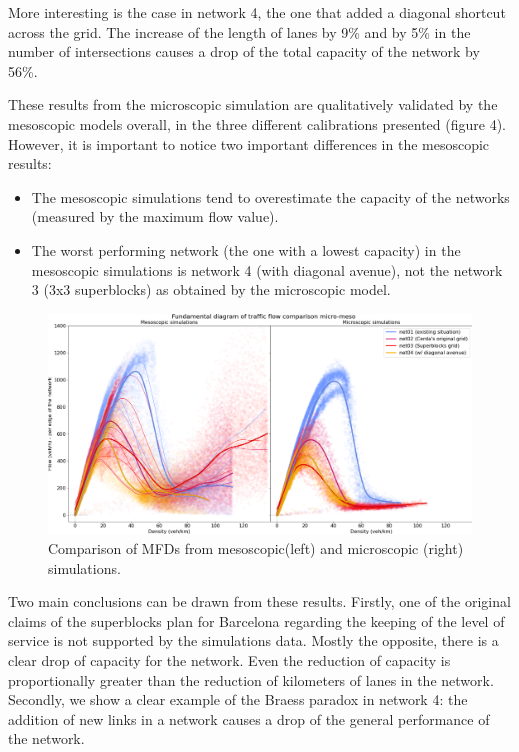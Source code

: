 \documentclass[11pt]{article}
\begin{document}
More interesting is the case in network 4, the one that added a diagonal shortcut across the grid. The increase of the length of lanes by 9\% and by 5\% in the number of intersections causes a drop of the total capacity of the network by 56\%.

These results from the microscopic simulation are qualitatively validated by the mesoscopic models overall, in the three different calibrations presented (figure 4). However, it is important to notice two important differences in the mesoscopic results:
\begin{itemize}
    \item The mesoscopic simulations tend to overestimate the capacity of the networks (measured by the maximum flow value).
    \item The worst performing network (the one with a lowest capacity) in the mesoscopic simulations is network 4 (with diagonal avenue), not the network 3 (3x3 superblocks) as obtained by the microscopic model.
\end{itemize}

\begin{figure}[htbp]
\centering
\includegraphics[width=\textwidth]{code/simulations/charts/MFD01_compar_micro-meso.png}
\caption{Comparison of MFDs from mesoscopic\footnotemark (left) and microscopic (right) simulations.}
\label{fig:MFD-comp-micro-meso.}
\end{figure}

Two main conclusions can be drawn from these results. Firstly, one of the original claims of the superblocks plan for Barcelona regarding the keeping of the level of service \citep{Rueda2018} is not supported by the simulations data. Mostly the opposite, there is a clear drop of capacity for the network. Even the reduction of capacity is proportionally greater than the reduction of kilometers of lanes in the network.
Secondly, we show a clear example of the Braess paradox in network 4: the addition of new links in a network causes a drop of the general performance of the network.  
\end{document}
